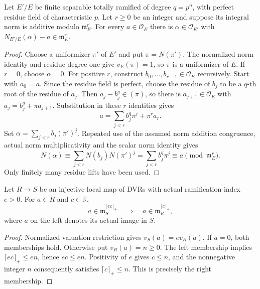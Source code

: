 \begin{lemma}
\label{fw:finite-norm-residue-digits}
\leanok
Let $E'/E$ be finite separable totally ramified of degree $q=p^n$,
with perfect residue field of characteristic $p$. Let $r\geq0$
be an integer and suppose its integral norm is additive modulo
$\mathfrak m_E^r$. For every $a\in\mathcal O_E$ there is
$\alpha\in\mathcal O_{E'}$ with
$N_{E'/E}(\alpha)-a\in\mathfrak m_E^r$.
\end{lemma}
\begin{proof}
Choose a uniformizer $\pi'$ of $E'$ and put $\pi=N(\pi')$.
The normalized norm identity and residue degree one give
$v_E(\pi)=1$, so $\pi$ is a uniformizer of $E$.
If $r=0$, choose $\alpha=0$. For positive $r$, construct
$b_0,\ldots,b_{r-1}\in\mathcal O_E$ recursively. Start with
$a_0=a$. Since the residue field is perfect, choose the residue
of $b_j$ to be a $q$-th root of the residue of $a_j$.
Then $a_j-b_j^q\in(\pi)$, so there is $a_{j+1}\in\mathcal O_E$
with $a_j=b_j^q+\pi a_{j+1}$. Substitution in these $r$ identities
gives
\[
 a=\sum_{j<r}b_j^q\pi^j+\pi^r a_r.
\]
Set $\alpha=\sum_{j<r}b_j(\pi')^j$. Repeated use of the assumed
norm addition congruence, actual norm multiplicativity and the
scalar norm identity gives
\[
 N(\alpha)\equiv\sum_{j<r}N(b_j)N(\pi')^j
   =\sum_{j<r}b_j^q\pi^j\equiv a\pmod{\mathfrak m_E^r}.
\]
Only finitely many residue lifts have been used.
\end{proof}

\begin{lemma}
\label{fw:ceil-precision-restriction}
\leanok
Let $R\longrightarrow S$ be an injective local map of DVRs with
actual ramification index $e>0$. For $a\in R$ and $c\in\mathbb R$,
\[
 a\in\mathfrak m_S^{\lceil ec\rceil_+}
 \quad\Longrightarrow\quad
 a\in\mathfrak m_R^{\lceil c\rceil_+},
\]
where $a$ on the left denotes its actual image in $S$.
\end{lemma}
\begin{proof}
Normalized valuation restriction gives $v_S(a)=e v_R(a)$.
If $a=0$, both memberships hold. Otherwise put $v_R(a)=n\geq0$.
The left membership implies $\lceil ec\rceil_+\leq en$, hence
$ec\leq en$. Positivity of $e$ gives $c\leq n$, and the
nonnegative integer $n$ consequently satisfies
$\lceil c\rceil_+\leq n$. This is precisely the right membership.
\end{proof}

